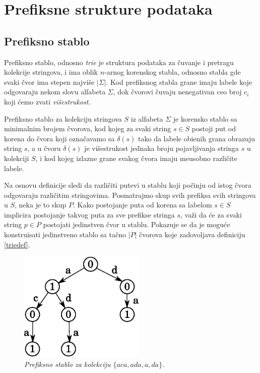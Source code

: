 \section{Prefiksne strukture podataka}

\subsection{Prefiksno stablo}

Prefiksno stablo, odnosno \textit{trie} je struktura podataka za \v cuvanje i pretragu kolekcije stringova, i ima oblik $n$-arnog korenskog stabla, odnosno stabla gde svaki \v cvor ima stepen najvi\v se $|\Sigma|$. Kod prefiksnog stabla grane imaju labele koje odgovaraju nekom slovu alfabeta $\Sigma$, dok \v cvorovi \v cuvaju nenegativan ceo broj $c_i$ koji \' cemo zvati \textit{vi\v sestrukost}.

\begin{dfn}
\label{triedef}
Prefiksno stablo za kolekciju stringova $S$ iz alfabeta $\Sigma$ je korensko stablo sa minimalnim brojem \v cvorova, kod kojeg za svaki string $s \in S$ postoji put od korena do \v cvora koji ozna\v cavamo sa $\delta(s)$ tako da labele obi\dj enih grana obrazuju string $s$, a u \v cvoru $\delta(s)$ je vi\v sestrukost jednaka broju pojavljivanja stringa $s$ u kolekciji $S$, i kod kojeg izlazne grane svakog \v cvora imaju me\dj usobno razli\v cite labele.
\end{dfn}

Na osnovu definicije sledi da razli\v citi putevi u stablu koji po\v cinju od istog \v cvora odgovaraju razli\v citim stringovima. Posmatrajmo skup svih prefiksa svih stringova u $S$, neka je to skup $P$. Kako postojanje puta od korena sa labelom $s \in S$ implicira postojanje takvog puta za sve prefikse stringa $s$, va\v zi da \' ce za svaki string $p \in P$ postojati jedinstven \v cvor u stablu. Pokazuje se da je mogu\' ce konstruisati jedinstveno stablo sa ta\v cno $|P|$ \v cvorova koje zadovoljava definiciju \ref{triedef}.

\begin{figure}[H]
    \centering
    \includegraphics[width=60mm]{../img/trie1.eps}
    \caption*{\textit{Prefiksno stablo za kolekciju $\{aca,ada,a,da\}$.}}
\end{figure}

